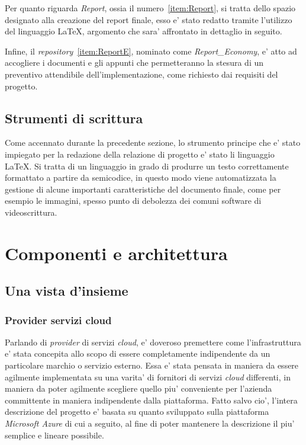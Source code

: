 \documentclass[a4paper]{report}
\begin{document}
		Per quanto riguarda \emph{Report}, ossia il numero~\ref{item:Report}, si tratta dello spazio designato alla
		creazione del report finale, esso e' stato redatto tramite l'utilizzo del linguaggio \LaTeX{}, argomento che
		sara' affrontato in dettaglio in seguito.

		Infine, il \emph{repository}~\ref{item:ReportE}, nominato come \emph{Report\_Economy}, e' atto ad accogliere i
		documenti e gli appunti che permetteranno la stesura di un preventivo attendibile dell'implementazione, come
		richiesto dai requisiti del progetto.
	\section{Strumenti di scrittura}\label{strumenti_di_scrittura}
		Come accennato durante la precedente sezione, lo strumento principe che e' stato impiegato per la redazione
		della relazione di progetto e' stato li linguaggio \LaTeX{}. Si tratta di un linguaggio in grado di produrre un
		testo correttamente formattato a partire da semicodice, in questo modo viene automatizzata la gestione di alcune
		importanti caratteristiche del documento finale, come per esempio le immagini, spesso punto di debolezza dei
		comuni software di videoscrittura.

\chapter{Componenti e architettura}\label{componenti_e_architettura}
	\section{Una vista d'insieme}\label{una_vista_dinsieme}
		\subsection{Provider servizi cloud}\label{provider_servizi_cloud}
			Parlando di \emph{provider} di servizi \emph{cloud}, e' doveroso premettere come l'infrastruttura e' stata
			concepita allo scopo di essere completamente indipendente da un particolare marchio o servizio esterno. Essa
			e' stata pensata in maniera da essere agilmente implementata su una varita' di fornitori di servizi
			\emph{cloud} differenti, in maniera da poter agilmente scegliere quello piu' conveniente per l'azienda
			committente in maniera indipendente dalla piattaforma. Fatto salvo cio', l'intera descrizione del progetto
			e' basata su quanto sviluppato sulla piattaforma \emph{Microsoft Azure} di cui a seguito, al fine di poter
			mantenere la descrizione il piu' semplice e lineare possibile.
\end{document}
